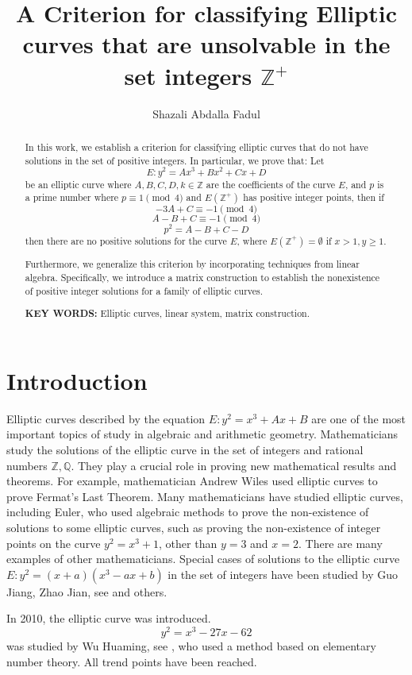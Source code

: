 \documentclass[11pt]{amsart}
\title{A Criterion for classifying Elliptic curves that are unsolvable in the set integers $\mathbb{Z}^+$}
\author{Shazali Abdalla Fadul}
\date{}
\begin{document}
\maketitle

\begin{abstract}
In this work, we establish a criterion for classifying elliptic curves that do not have solutions in the set of positive integers. In particular, we prove that: Let
\[
E: y^2 = Ax^3 + Bx^2 + Cx + D
\]
be an elliptic curve where $A,B,C,D,k \in \mathbb{Z}$ are the coefficients of the curve $E$, and $p$ is a prime number where $p \equiv 1 \pmod 4$ and $E(\mathbb{Z}^+)$ has positive integer points, then if
\[
-3A + C \equiv -1 \pmod 4
\]
\[
A - B + C \equiv -1 \pmod 4
\]
\[
p^2 = A - B + C - D
\]
then there are no positive solutions for the curve $E$, where $E(\mathbb{Z}^+) = \emptyset$ if $x>1, y \ge 1$.

Furthermore, we generalize this criterion by incorporating techniques from linear algebra. Specifically, we introduce a matrix construction to establish the nonexistence of positive integer solutions for a family of elliptic curves.

\textbf{KEY WORDS:} Elliptic curves, linear system, matrix construction.
\end{abstract}

\section{Introduction}

Elliptic curves described by the equation $E: y^2 = x^3 + Ax + B$ are one of the most important topics of study in algebraic and arithmetic geometry. Mathematicians study the solutions of the elliptic curve in the set of integers and rational numbers $\mathbb{Z}, \mathbb{Q}$. They play a crucial role in proving new mathematical results and theorems. For example, mathematician Andrew Wiles \cite{ref14} used elliptic curves to prove Fermat's Last Theorem. Many mathematicians have studied elliptic curves, including Euler, who used algebraic methods to prove the non-existence of solutions to some elliptic curves, such as proving the non-existence of integer points on the curve $y^2 = x^3+1$, other than $y=3$ and $x=2$. There are many examples of other mathematicians. Special cases of solutions to the elliptic curve $E: y^2 = (x+a)(x^3-ax+b)$ in the set of integers have been studied by Guo Jiang, Zhao Jian, see \cite{ref25,ref26,ref18} and others.

In 2010, the elliptic curve was introduced.
\[
y^2 = x^3 - 27x - 62
\]
was studied by Wu Huaming, see \cite{ref25}, who used a method based on elementary number theory. All trend points have been reached.
\end{document}
